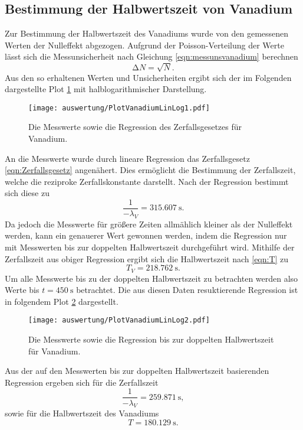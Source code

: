 \subsection{Bestimmung der Halbwertszeit von Vanadium}
  \label{sec:vanadium1}
  Zur Bestimmung der Halbwertszeit des Vanadiums wurde von den gemessenen Werten der Nulleffekt abgezogen. Aufgrund der Poisson-Verteilung der Werte lässt sich die Messunsicherheit nach
  Gleichung \eqref{eqn:messunsvanadium} berechnen
  \begin{equation}
    \label{eqn:messunsvanadium}
    \increment N = \sqrt{N} .
  \end{equation}
  Aus den so erhaltenen Werten und Unsicherheiten ergibt sich der im Folgenden dargestellte Plot \ref{fig:PlotVanadiumLinLog1} mit halblogarithmischer Darstellung.
  \begin{figure}[H]
    \centering
    \texttt{[image: auswertung/PlotVanadiumLinLog1.pdf]}
    \caption{Die Messwerte sowie die Regression des Zerfallsgesetzes für Vanadium.}
    \label{fig:PlotVanadiumLinLog1}
  \end{figure}
  \noindent
  An die Messwerte wurde durch lineare Regression das Zerfallsgesetz \ref{eqn:Zerfallsgesetz} angenähert. Dies ermöglicht die Bestimmung der Zerfallszeit, welche die reziproke Zerfallskonstante
  darstellt. Nach der Regression bestimmt sich diese zu
  \begin{equation}
    \label{eqn:zerfallszeitergebniss1}
    \frac{1}{-\lambda_{V}} = \SI{315.607}{\second}.
  \end{equation}
  Da jedoch die Messwerte für größere Zeiten allmählich kleiner als der Nulleffekt werden, kann ein genauerer Wert gewonnen werden, indem die Regression nur mit Messwerten bis zur doppelten
  Halbwertszeit durchgeführt wird. Mithilfe der Zerfallszeit aus obiger Regression ergibt sich die Halbwertszeit nach \ref{eqn:T} zu
  \begin{equation}
    \label{eqn:halbwertszeitergebniss1}
    T_{V} = \SI{218.762}{\second}.
  \end{equation}
  Um alle Messwerte bis zu der doppelten Halbwertszeit zu betrachten werden also Werte bis $t = \SI{450}{\second}$ betrachtet. Die aus diesen Daten resuktierende Regression ist in folgendem
  Plot \ref{fig:PlotVanadiumLinLog2} dargestellt.
  \begin{figure}[H]
    \centering
    \texttt{[image: auswertung/PlotVanadiumLinLog2.pdf]}
    \caption{Die Messwerte sowie die Regression bis zur doppelten Halbwertszeit für Vanadium.}
    \label{fig:PlotVanadiumLinLog2}
  \end{figure}
  \noindent
  Aus der auf den Messwerten bis zur doppelten Halbwertszeit basierenden Regression ergeben sich für die Zerfallszeit
  \begin{equation}
    \label{eqn:zerfallszeitergebniss2}
    \frac{1}{-\lambda_{V}} = \SI{259.871}{\second},
  \end{equation}
  sowie für die Halbwertszeit des Vanadiums
  \begin{equation}
    \label{eqn:halbwertszeitergebniss2}
    T = \SI{180.129}{\second}.
  \end{equation}
